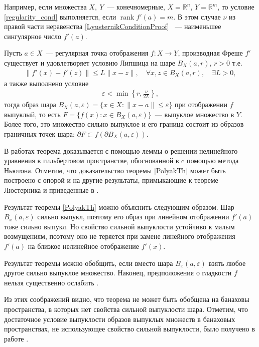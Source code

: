 \documentclass[../main.tex]{subfiles}
\begin{document}
	Например, если множества $X,\ Y$~--- конечномерные, $X = \mathbb{R}^n$, $Y = \mathbb{R}^m$, то условие \eqref{regularity_cond} выполняется, если  $ \operatorname{rank} f'(a) = m$. В этом случае $\nu$ из правой части неравенства \eqref{LyusternikConditionProof} ~--- наименьшее сингулярное число $f'(a)$. 
	\begin{theorem}\label{PolyakTh}
		Пусть $a \in X$~--- регулярная точка отображения $f: X \rightarrow Y$, производная Фреше $f'$ существует и удовлетворяет условию Липшица на шаре  $B_X(a,r) $, $r > 0$  т.е. 
		\begin{gather}\label{lip_cond}
			\| f'(x) - f'(z) \| \leqslant L \| x - z \|, \quad \forall x,z \in B_X(a,r), \quad \exists L > 0,
		\end{gather}
		а также выполнено условие
		\begin{gather}
			\varepsilon < \min\left\{r,\frac{\nu}{2L}\right\},
		\end{gather}
		тогда образ шара $B_X(a,\varepsilon) = \{x \in X: \| x - a\| \leqslant \varepsilon\}$ при отображении $f$ выпуклый, то есть $F = 
		\{f(x): x \in B_X(a,\varepsilon)\}$~--- выпуклое множество в $Y$. Более того, это множество сильно выпуклое и его граница состоит из образов граничных точек шара: $\partial F \subset f(\partial B_X(a,\varepsilon))$.
	\end{theorem}
	
	В работах \cite{Polyak2001, Polyak2001ru} теорема доказывается с помощью леммы о решении нелинейного уравнения в гильбертовом пространстве, обоснованной в \cite{Polyak1964} c помощью метода Ньютона. Отметим, что доказательство теоремы \ref{PolyakTh} может быть построено с опорой и на другие результаты, примыкающие к теореме Люстерника и приведенные в \cite{Dmitruk1980, Ioffe}.
	
	Результат теоремы \ref{PolyakTh} можно объяснить следующим образом. Шар $B_x(a,\varepsilon)$ сильно выпукл, поэтому его образ при линейном отображении $f'(a)$ тоже сильно выпукл. Но свойство сильной выпуклости устойчиво к малым возмущениям, поэтому оно не теряется при замене линейного отображения $f'(a)$ на близкое нелинейное отображение $f'(x)$. 
	
	Результат теоремы можно обобщить, если вместо шара $B_x(a,\varepsilon) $ взять любое другое сильно выпуклое множество. Наконец, предположения о гладкости $f$ нельзя существенно ослабить \cite{Polyak2001, Polyak2001ru}.
	
	Из этих соображений видно, что теорема не может быть обобщена на банаховы пространства, в которых нет свойства сильной выпуклости шара. Отметим, что достаточное условие выпуклости  образов выпуклых множеств в банаховых пространствах, не использующее свойство сильной выпуклости, было получено в работе \cite{Ledyaev}. 
	
\end{document}
